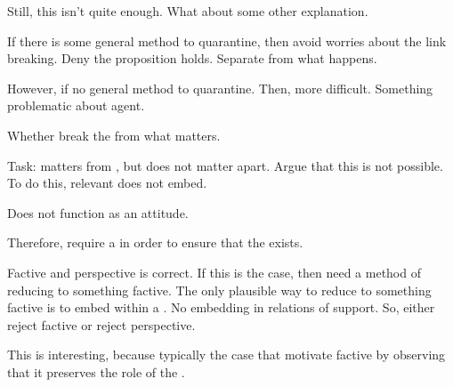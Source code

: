 \begin{note}
  Still, this isn't quite enough.
  What about some other explanation.

  If there is some general method to quarantine, then avoid worries about the link breaking.
  Deny the proposition holds.
  Separate \agpe{} from what happens.

  However, if no general method to quarantine.
  Then, more difficult.
  Something problematic about agent.

  Whether break the \agpe{} from what matters.

  Task: \fc{} matters from \agpe{}, but does not matter apart.
  Argue that this is not possible.
  To do this, relevant \fc{} does not embed.

  Does not function as an attitude.
\end{note}

\begin{note}
  Therefore, require a \wit{} in order to ensure that the \ros{} exists.
\end{note}

\begin{note}
  Factive and perspective is correct.
  If this is the case, then need a method of reducing to something factive.
  The only plausible way to reduce to something factive is to embed within a \ros{}.
  No embedding in relations of support.
  So, either reject factive or reject perspective.

  This is interesting, because typically the case that motivate factive by observing that it preserves the role of the \agpe{}.
\end{note}

\subsection{\citeauthor{Owens:2006tw}}

